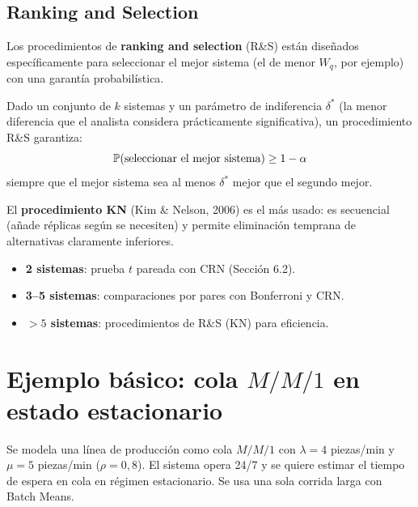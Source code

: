 \documentclass[11pt, letterpaper]{article}
\begin{document}
\subsection{Ranking and Selection}

Los procedimientos de \textbf{ranking and selection} (R\&S) están diseñados específicamente para seleccionar el mejor sistema (el de menor $W_q$, por ejemplo) con una garantía probabilística.

\begin{definicionbox}
Dado un conjunto de $k$ sistemas y un parámetro de indiferencia $\delta^*$ (la menor diferencia que el analista considera prácticamente significativa), un procedimiento R\&S garantiza:
\[
\mathbb{P}(\text{seleccionar el mejor sistema}) \ge 1-\alpha
\]
siempre que el mejor sistema sea al menos $\delta^*$ mejor que el segundo mejor.
\end{definicionbox}

El \textbf{procedimiento KN} (Kim \& Nelson, 2006) es el más usado: es secuencial (añade réplicas según se necesiten) y permite eliminación temprana de alternativas claramente inferiores.

\begin{notabox}
\begin{itemize}
    \item \textbf{2 sistemas}: prueba $t$ pareada con CRN (Sección 6.2).
    \item \textbf{3--5 sistemas}: comparaciones por pares con Bonferroni y CRN.
    \item \textbf{$>5$ sistemas}: procedimientos de R\&S (KN) para eficiencia.
\end{itemize}
\end{notabox}

\section{Ejemplo básico: cola $M/M/1$ en estado estacionario}

\begin{ejemplobox}[Sistema]
Se modela una línea de producción como cola $M/M/1$ con $\lambda=4$ piezas/min y $\mu=5$ piezas/min ($\rho=0{,}8$). El sistema opera 24/7 y se quiere estimar el tiempo de espera en cola en régimen estacionario. Se usa una sola corrida larga con Batch Means.
\end{ejemplobox}
\end{document}
